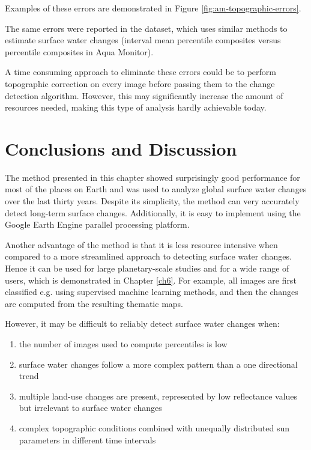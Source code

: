 Examples of these errors are demonstrated in Figure \ref{fig:am-topographic-errors}. 

The same errors were reported in the \citet{Hansen2013} dataset, which uses similar methods to estimate surface water changes (interval mean percentile composites versus percentile composites in Aqua Monitor).

A time consuming approach to eliminate these errors could be to perform topographic correction on every image before passing them to the change detection algorithm. However, this may significantly increase the amount of resources needed, making this type of analysis hardly achievable today.


\section{Conclusions and Discussion}

The method presented in this chapter showed surprisingly good performance for most of the places on Earth and was used to analyze global surface water changes over the last thirty years. Despite its simplicity, the method can very accurately detect long-term surface changes. Additionally, it is easy to implement using the Google Earth Engine parallel processing platform.

Another advantage of the method is that it is less resource intensive when compared to a more streamlined approach to detecting surface water changes. Hence it can be used for large planetary-scale studies and for a wide range of users, which is demonstrated in Chapter \ref{ch6}. For example, all images are first classified e.g. using supervised machine learning methods, and then the changes are computed from the resulting thematic maps.

However, it may be difficult to reliably detect surface water changes when:

\begin{enumerate}[label=(\alph*)]
	\item \label{enum:changes-low-count} the number of images used to compute percentiles is low
	\item \label{enum:changes-complex-trend} surface water changes follow a more complex pattern than a one directional trend
	\item \label{enum:changes-multple-classes} multiple land-use changes are present, represented by low reflectance values but irrelevant to surface water changes
	\item \label{enum:changes-topo} complex topographic conditions combined with unequally distributed sun parameters in different time intervals
\end{enumerate}

